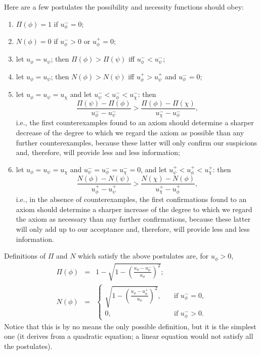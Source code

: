 \documentclass{llncs}
\begin{document}
Here are a few postulates the possibility
and necessity functions should obey:
\begin{enumerate}
\item $\Pi(\phi) = 1$ if $u_\phi^- = 0$;
\item $N(\phi) = 0$ if $u_\phi^- > 0$ or $u_\phi^+ = 0$;
\item let $u_\phi = u_\psi$; then $\Pi(\phi) > \Pi(\psi)$ iff $u_\phi^- < u_\psi^-$;
\item let $u_\phi = u_\psi$; then $N(\phi) > N(\psi)$ iff $u_\phi^+ > u_\psi^+$ and $u_\phi^- = 0$;
\item let $u_\phi = u_\psi = u_\chi$ and let $u_\psi^- < u_\phi^- < u_\chi^-$: then
  \[
    \frac{\Pi(\psi) - \Pi(\phi)}{u_\phi^- - u_\psi^-} > \frac{\Pi(\phi) - \Pi(\chi)}{u_\chi^- - u_\phi^-},
  \]
  i.e., the first counterexamples found to an axiom should determine a sharper decrease
  of the degree to which we regard the axiom as possible than any further counterexamples,
  because these latter will only confirm our suspicions and, therefore, will provide
  less and less information;
\item let $u_\phi = u_\psi = u_\chi$ and $u_\psi^- = u_\phi^- = u_\chi^- = 0$,
  and let $u_\psi^+ < u_\phi^+ < u_\chi^+$: then
  \[
    \frac{N(\phi) - N(\psi)}{u_\phi^+ - u_\psi^+} > \frac{N(\chi) - N(\phi)}{u_\chi^+ - u_\phi^+},
  \]
  i.e., in the absence of counterexamples,
  the first confirmations found to an axiom should determine a sharper increase
  of the degree to which we regard the axiom as necessary than any further confirmations,
  because these latter will only add up to our acceptance and, therefore, will provide
  less and less information.%
\end{enumerate}

Definitions of $\Pi$ and $N$ which satisfy the above postulates are, for $u_\phi > 0$,
\begin{eqnarray}
  \Pi(\phi) &=& 1 - \sqrt{1 - \left(\frac{u_\phi - u_\phi^-}{u_\phi}\right)^2}; \\
  N(\phi) &=& \left\{\begin{array}{ll}
    \sqrt{1 - \left(\frac{u_\phi - u_\phi^+}{u_\phi}\right)^2},\quad & \mbox{if $u_\phi^- = 0$,}\\[1.5em]
    0, & \mbox{if $u_\phi^- > 0$.}
  \end{array}\right.
\end{eqnarray}
Notice that this is by no means the only possible definition, but 
it is the simplest one (it derives from a quadratic equation; a linear equation would
not satisfy all the postulates).
\end{document}
